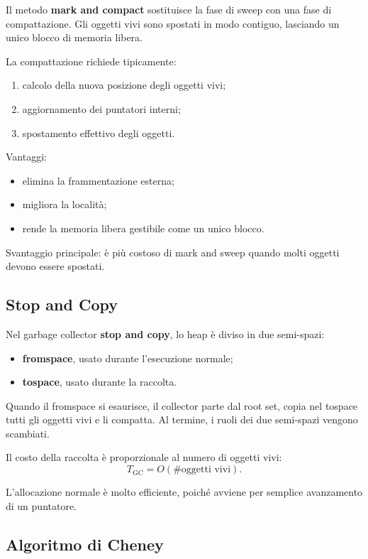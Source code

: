 \documentclass{article}
\begin{document}
Il metodo \textbf{mark and compact} sostituisce la fase di sweep con una fase di compattazione. Gli oggetti vivi sono spostati in modo contiguo, lasciando un unico blocco di memoria libera.

La compattazione richiede tipicamente:
\begin{enumerate}
  \item calcolo della nuova posizione degli oggetti vivi;
  \item aggiornamento dei puntatori interni;
  \item spostamento effettivo degli oggetti.
\end{enumerate}

Vantaggi:
\begin{itemize}
  \item elimina la frammentazione esterna;
  \item migliora la località;
  \item rende la memoria libera gestibile come un unico blocco.
\end{itemize}

Svantaggio principale: è più costoso di mark and sweep quando molti oggetti devono essere spostati.

\subsection{Stop and Copy}

Nel garbage collector \textbf{stop and copy}, lo heap è diviso in due semi-spazi:
\begin{itemize}
  \item \textbf{fromspace}, usato durante l'esecuzione normale;
  \item \textbf{tospace}, usato durante la raccolta.
\end{itemize}

Quando il fromspace si esaurisce, il collector parte dal root set, copia nel tospace tutti gli oggetti vivi e li compatta. Al termine, i ruoli dei due semi-spazi vengono scambiati.

Il costo della raccolta è proporzionale al numero di oggetti vivi:
\[
T_{\mathrm{GC}} = O(\#\text{oggetti vivi}).
\]

L'allocazione normale è molto efficiente, poiché avviene per semplice avanzamento di un puntatore.

\subsection{Algoritmo di Cheney}
\end{document}
